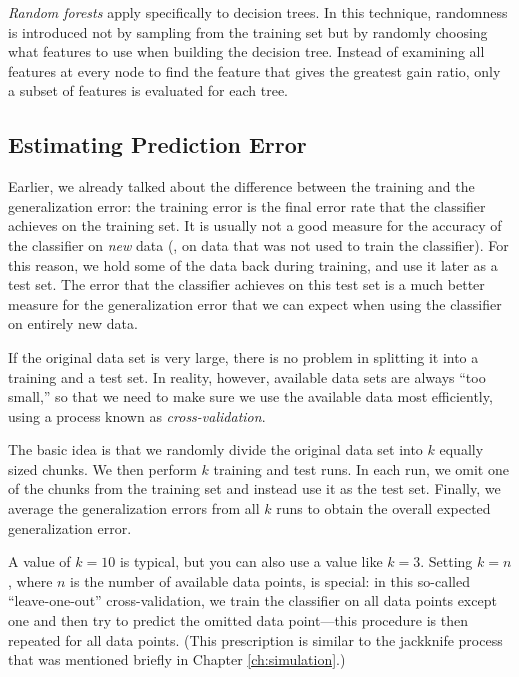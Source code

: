 \emph{Random forests} apply specifically to decision trees.  In this
technique, randomness is introduced not by sampling from the training
set but by\vadjust{\pagebreak} randomly choosing what features to use when building the
decision tree. Instead of examining all features at every node to find
the feature that gives the greatest gain ratio, only a subset of
features is evaluated for each tree.

\spreadlong{-13pt}

\subsection{Estimating Prediction Error}

 
Earlier, we already talked about the difference between the training
and the generalization error:  the training error is the final error
rate that the classifier achieves on the training set. It is usually
not a good measure for the accuracy of the classifier on \emph{new}
data (\ie, on data that was not used to train the classifier). For
this reason, we hold some of the data back during training, and use it
later as a test set. The error that the classifier achieves on this test
set is a much better measure for the generalization error that we can
expect when using the classifier on entirely new data.

If the original data set is very large, there is no problem in
splitting it into a training and a test set. In reality, however,
available data sets are always ``too small,'' so that we need to make
sure we use the available data most efficiently, using a process known
as \emph{cross-validation}.  

The basic idea is that we randomly divide the original data set into
$k$ equally sized chunks. We then perform $k$ training and test runs.
In each run, we omit one of the chunks from the training set and
instead use it as the test set. Finally, we average the generalization
errors from all $k$ runs to obtain the overall expected generalization
error.

A value of $k=10$ is typical, but you can also use a value like $k=3$.
Setting $k=n$, where $n$ is the number of available data points, is
special: in this so-called ``leave-one-out'' cross-validation, we
train the classifier on all data points except one and then try to
predict the omitted data point---this procedure is then repeated for
all data points. (This prescription is similar to the jackknife
process that was mentioned briefly in Chapter \ref{ch:simulation}.)

